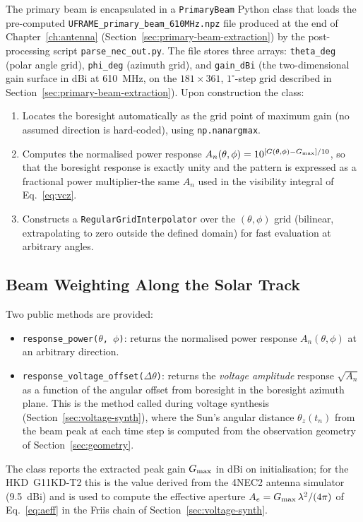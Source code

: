 The primary beam is encapsulated in a \texttt{PrimaryBeam} Python class that
loads the pre-computed \texttt{UFRAME\_primary\_beam\_610MHz.npz} file
produced at the end of Chapter~\ref{ch:antenna}
(Section~\ref{sec:primary-beam-extraction}) by the post-processing script
\texttt{parse\_nec\_out.py}. The file stores three arrays: \texttt{theta\_deg}
(polar angle grid), \texttt{phi\_deg} (azimuth grid), and \texttt{gain\_dBi}
(the two-dimensional gain surface in dBi at \SI{610}{\mega\hertz}, on the
$181\times361$, $1^\circ$-step grid described in
Section~\ref{sec:primary-beam-extraction}). Upon construction the class:
\begin{enumerate}[leftmargin=*]
  \item Locates the boresight automatically as the grid point of maximum gain
  (no assumed direction is hard-coded), using \texttt{np.nanargmax}.
  \item Computes the normalised power response
  $A_n(\theta,\phi) = 10^{[G(\theta,\phi)-G_{\rm max}]/10}$, so that the
  boresight response is exactly unity and the pattern is expressed as a
  fractional power multiplier-the same $A_n$ used in the visibility integral
  of Eq.~\eqref{eq:vcz}.
  \item Constructs a \texttt{RegularGridInterpolator} over the
  $(\theta,\phi)$ grid (bilinear, extrapolating to zero outside the defined
  domain) for fast evaluation at arbitrary angles.
\end{enumerate}

\subsection{Beam Weighting Along the Solar Track}
\label{subsec:beam-weighting}

Two public methods are provided:
\begin{itemize}
  \item \texttt{response\_power($\theta$, $\phi$)}: returns the normalised
  power response $A_n(\theta,\phi)$ at an arbitrary direction.
  \item \texttt{response\_voltage\_offset($\Delta\theta$)}: returns the
  \emph{voltage amplitude} response $\sqrt{A_n}$ as a function of the angular
  offset from boresight in the boresight azimuth plane. This is the method
  called during voltage synthesis (Section~\ref{sec:voltage-synth}), where
  the Sun's angular distance $\theta_z(t_n)$ from the beam peak at each time
  step is computed from the observation geometry of
  Section~\ref{sec:geometry}.
\end{itemize}
The class reports the extracted peak gain $G_{\rm max}$ in dBi on
initialisation; for the HKD~G11KD-T2 this is the value derived from the
4NEC2 antenna simulator (\SI{9.5}{dBi}) and is used to compute the effective
aperture $A_e = G_{\rm max}\,\lambda^2/(4\pi)$ of Eq.~\eqref{eq:aeff} in the
Friis chain of Section~\ref{sec:voltage-synth}.

